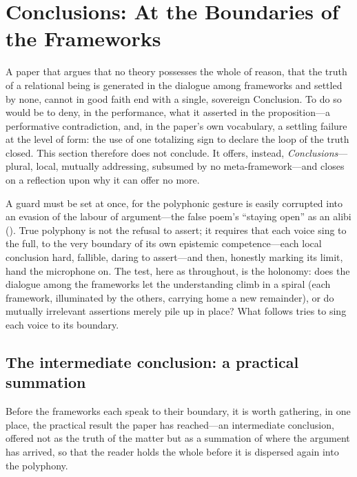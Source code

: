 \section{Conclusions: At the Boundaries of the Frameworks}
\label{p09:sec:conclusions}

\noindent
A paper that argues that no theory possesses the whole of reason, that the truth of a relational being is generated in the dialogue among frameworks and settled by none, cannot in good faith end with a single, sovereign Conclusion. To do so would be to deny, in the performance, what it asserted in the proposition---a performative contradiction, and, in the paper's own vocabulary, a settling failure at the level of form: the use of one totalizing sign to declare the loop of the truth closed. This section therefore does not conclude. It offers, instead, \emph{Conclusions}---plural, local, mutually addressing, subsumed by no meta-framework---and closes on a reflection upon why it can offer no more.

A guard must be set at once, for the polyphonic gesture is easily corrupted into an evasion of the labour of argument---the false poem's ``staying open'' as an alibi (). True polyphony is not the refusal to assert; it requires that each voice sing to the full, to the very boundary of its own epistemic competence---each local conclusion hard, fallible, daring to assert---and then, honestly marking its limit, hand the microphone on. The test, here as throughout, is the holonomy: does the dialogue among the frameworks let the understanding climb in a spiral (each framework, illuminated by the others, carrying home a new remainder), or do mutually irrelevant assertions merely pile up in place? What follows tries to sing each voice to its boundary.

\subsection{The intermediate conclusion: a practical summation}
\label{p09:sec:intermediate}

Before the frameworks each speak to their boundary, it is worth gathering, in one place, the practical result the paper has reached---an intermediate conclusion, offered not as the truth of the matter but as a summation of where the argument has arrived, so that the reader holds the whole before it is dispersed again into the polyphony.

